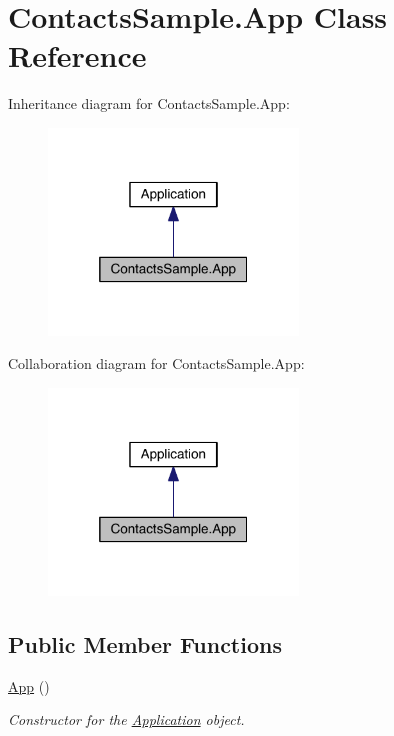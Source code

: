 \hypertarget{class_contacts_sample_1_1_app}{\section{Contacts\+Sample.\+App Class Reference}
\label{class_contacts_sample_1_1_app}
}


Inheritance diagram for Contacts\+Sample.\+App\+:
\nopagebreak
\begin{figure}[H]
\begin{center}
\leavevmode
\includegraphics[width=188pt]{class_contacts_sample_1_1_app__inherit__graph}
\end{center}
\end{figure}


Collaboration diagram for Contacts\+Sample.\+App\+:
\nopagebreak
\begin{figure}[H]
\begin{center}
\leavevmode
\includegraphics[width=188pt]{class_contacts_sample_1_1_app__coll__graph}
\end{center}
\end{figure}
\subsection*{Public Member Functions}
\begin{DoxyCompactItemize}
\item 
\hyperlink{class_contacts_sample_1_1_app_a6f5f4d86f466d490a90d31e66ed34e1c}{App} ()
\begin{DoxyCompactList}\small\item\em Constructor for the \hyperlink{class_contacts_sample_1_1_application}{Application} object. \end{DoxyCompactList}\end{DoxyCompactItemize}
